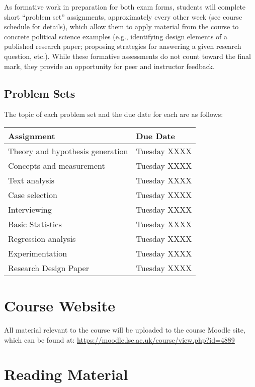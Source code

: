 \documentclass[12pt,a4paper]{article}
\begin{document}
As formative work in preparation for both exam forms, students will complete short ``problem set'' assignments, approximately every other week (see course schedule for details), which allow them to apply material from the course to concrete political science examples (e.g., identifying design elements of a published research paper; proposing strategies for answering a given research question, etc.). While these formative assessments do not count toward the final mark, they provide an opportunity for peer and instructor feedback.

\subsection{Problem Sets}

The topic of each problem set and the due date for each are as follows:

\begin{center}
\begin{tabular}{ll} \toprule
Assignment & Due Date \\ \midrule
Theory and hypothesis generation & Tuesday XXXX \\
Concepts and measurement & Tuesday XXXX \\
Text analysis & Tuesday XXXX \\
Case selection & Tuesday XXXX \\
Interviewing & Tuesday XXXX \\
Basic Statistics & Tuesday XXXX \\
Regression analysis & Tuesday XXXX \\
Experimentation & Tuesday XXXX \\ \midrule 
Research Design Paper & Tuesday XXXX \\ \bottomrule
\end{tabular}
\end{center}


\section{Course Website}

All material relevant to the course will be uploaded to the course Moodle site, which can be found at: \url{https://moodle.lse.ac.uk/course/view.php?id=4889}


\section{Reading Material}
\end{document}
